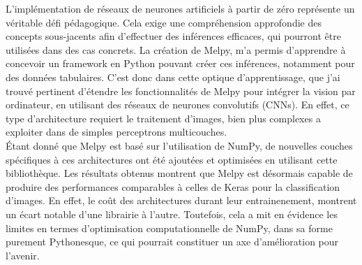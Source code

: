 L’implémentation de réseaux de neurones artificiels à partir de zéro représente un véritable 
défi pédagogique. Cela exige une compréhension approfondie des concepts sous-jacents afin 
d’effectuer des inférences efficaces, qui pourront être utilisées dans des cas concrets. 
La création de Melpy, m’a permis d’apprendre à concevoir 
un framework en Python pouvant créer ces inférences, notamment pour des données tabulaires.
C'est donc dans cette optique d'apprentissage, que j'ai trouvé pertinent d’étendre les fonctionnalités de Melpy 
pour intégrer la vision par ordinateur, en utilisant des réseaux de neurones convolutifs (CNNs). 
En effet, ce type d’architecture requiert le traitement d'images, bien plus complexes a exploiter dans de 
simples perceptrons multicouches. \\

Étant donné que Melpy est basé sur l'utilisation de NumPy, de nouvelles couches spécifiques à ces 
architectures ont été ajoutées et optimisées en utilisant cette bibliothèque. Les résultats obtenus 
montrent que Melpy est désormais capable de produire des performances comparables à celles de Keras 
pour la classification d’images. En effet, le coût des architectures durant leur entrainenement, montrent
un écart notable d'une librairie à l'autre. Toutefois, cela a mit en évidence les limites en termes d’optimisation 
computationnelle de NumPy, dans sa forme purement Pythonesque, ce qui pourrait constituer un axe d’amélioration 
pour l’avenir.